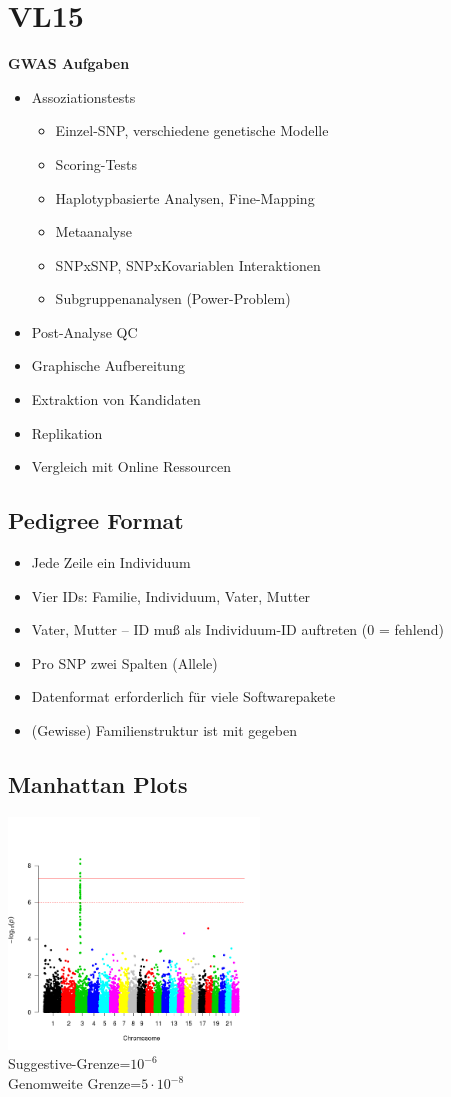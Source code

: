 \section{VL15}
\textbf{GWAS Aufgaben}
\begin{itemize}
	\item Assoziationstests
	\begin{itemize}
		\item Einzel-SNP, verschiedene genetische Modelle
		\item Scoring-Tests
		\item Haplotypbasierte Analysen, Fine-Mapping
		\item Metaanalyse
		\item SNPxSNP, SNPxKovariablen Interaktionen
		\item Subgruppenanalysen (Power-Problem)
	\end{itemize}
	\item Post-Analyse QC
	\item Graphische Aufbereitung
	\item Extraktion von Kandidaten
	\item Replikation
	\item Vergleich mit Online Ressourcen
\end{itemize}

\subsection{Pedigree Format}
\begin{itemize}
	\item Jede Zeile ein Individuum
	\item Vier IDs: Familie, Individuum, Vater, Mutter
	\item Vater, Mutter – ID muß als Individuum-ID auftreten (0 = fehlend)
	\item Pro SNP zwei Spalten (Allele)
	\item Datenformat erforderlich für viele Softwarepakete
	\item (Gewisse) Familienstruktur ist mit gegeben
\end{itemize}

\subsection{Manhattan Plots}
\includegraphics[width=0.5\textwidth]{lectures/V15/pix/manhatten_plot.png}\\
Suggestive-Grenze=$10^{-6}$\\
Genomweite Grenze=$5\cdot 10^{-8}$
